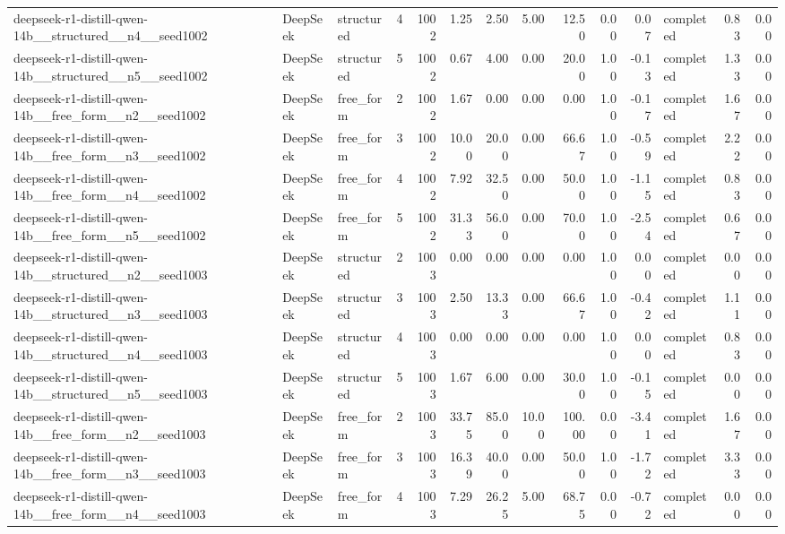\begin{longtable}{lllrrrrrrrrlrr}
deepseek-r1-distill-qwen-14b\_\_structured\_\_n4\_\_seed1002 & DeepSeek & structured & 4 & 1002 & 1.25 & 2.50 & 5.00 & 12.50 & 0.00 & 0.07 & completed & 0.83 & 0.00 \\
deepseek-r1-distill-qwen-14b\_\_structured\_\_n5\_\_seed1002 & DeepSeek & structured & 5 & 1002 & 0.67 & 4.00 & 0.00 & 20.00 & 1.00 & -0.13 & completed & 1.33 & 0.00 \\
deepseek-r1-distill-qwen-14b\_\_free\_form\_\_n2\_\_seed1002 & DeepSeek & free\_form & 2 & 1002 & 1.67 & 0.00 & 0.00 & 0.00 & 1.00 & -0.17 & completed & 1.67 & 0.00 \\
deepseek-r1-distill-qwen-14b\_\_free\_form\_\_n3\_\_seed1002 & DeepSeek & free\_form & 3 & 1002 & 10.00 & 20.00 & 0.00 & 66.67 & 1.00 & -0.59 & completed & 2.22 & 0.00 \\
deepseek-r1-distill-qwen-14b\_\_free\_form\_\_n4\_\_seed1002 & DeepSeek & free\_form & 4 & 1002 & 7.92 & 32.50 & 0.00 & 50.00 & 1.00 & -1.15 & completed & 0.83 & 0.00 \\
deepseek-r1-distill-qwen-14b\_\_free\_form\_\_n5\_\_seed1002 & DeepSeek & free\_form & 5 & 1002 & 31.33 & 56.00 & 0.00 & 70.00 & 1.00 & -2.54 & completed & 0.67 & 0.00 \\
deepseek-r1-distill-qwen-14b\_\_structured\_\_n2\_\_seed1003 & DeepSeek & structured & 2 & 1003 & 0.00 & 0.00 & 0.00 & 0.00 & 1.00 & 0.00 & completed & 0.00 & 0.00 \\
deepseek-r1-distill-qwen-14b\_\_structured\_\_n3\_\_seed1003 & DeepSeek & structured & 3 & 1003 & 2.50 & 13.33 & 0.00 & 66.67 & 1.00 & -0.42 & completed & 1.11 & 0.00 \\
deepseek-r1-distill-qwen-14b\_\_structured\_\_n4\_\_seed1003 & DeepSeek & structured & 4 & 1003 & 0.00 & 0.00 & 0.00 & 0.00 & 1.00 & 0.00 & completed & 0.83 & 0.00 \\
deepseek-r1-distill-qwen-14b\_\_structured\_\_n5\_\_seed1003 & DeepSeek & structured & 5 & 1003 & 1.67 & 6.00 & 0.00 & 30.00 & 1.00 & -0.15 & completed & 0.00 & 0.00 \\
deepseek-r1-distill-qwen-14b\_\_free\_form\_\_n2\_\_seed1003 & DeepSeek & free\_form & 2 & 1003 & 33.75 & 85.00 & 10.00 & 100.00 & 0.00 & -3.41 & completed & 1.67 & 0.00 \\
deepseek-r1-distill-qwen-14b\_\_free\_form\_\_n3\_\_seed1003 & DeepSeek & free\_form & 3 & 1003 & 16.39 & 40.00 & 0.00 & 50.00 & 1.00 & -1.72 & completed & 3.33 & 0.00 \\
deepseek-r1-distill-qwen-14b\_\_free\_form\_\_n4\_\_seed1003 & DeepSeek & free\_form & 4 & 1003 & 7.29 & 26.25 & 5.00 & 68.75 & 0.00 & -0.72 & completed & 0.00 & 0.00 \\

\end{longtable}
